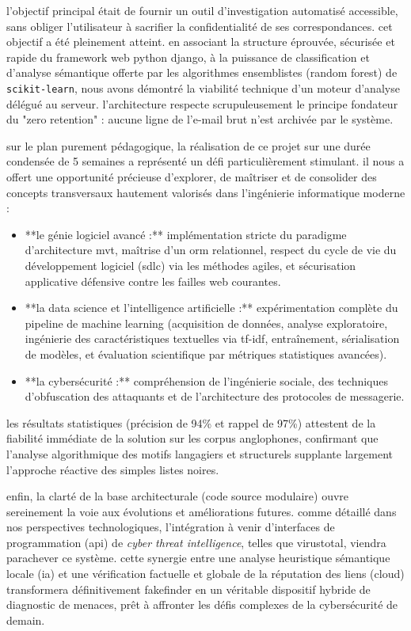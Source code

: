 \documentclass[12pt,a4paper]{report}
\begin{document}
l'objectif principal était de fournir un outil d'investigation automatisé accessible, sans obliger l'utilisateur à sacrifier la confidentialité de ses correspondances. cet objectif a été pleinement atteint. en associant la structure éprouvée, sécurisée et rapide du framework web python django, à la puissance de classification et d'analyse sémantique offerte par les algorithmes ensemblistes (random forest) de \texttt{scikit-learn}, nous avons démontré la viabilité technique d'un moteur d'analyse délégué au serveur. l'architecture respecte scrupuleusement le principe fondateur du "zero retention" : aucune ligne de l'e-mail brut n'est archivée par le système.

sur le plan purement pédagogique, la réalisation de ce projet sur une durée condensée de 5 semaines a représenté un défi particulièrement stimulant. il nous a offert une opportunité précieuse d'explorer, de maîtriser et de consolider des concepts transversaux hautement valorisés dans l'ingénierie informatique moderne :
\begin{itemize}
    \item **le génie logiciel avancé :** implémentation stricte du paradigme d'architecture mvt, maîtrise d'un orm relationnel, respect du cycle de vie du développement logiciel (sdlc) via les méthodes agiles, et sécurisation applicative défensive contre les failles web courantes.
    \item **la data science et l'intelligence artificielle :** expérimentation complète du pipeline de machine learning (acquisition de données, analyse exploratoire, ingénierie des caractéristiques textuelles via tf-idf, entraînement, sérialisation de modèles, et évaluation scientifique par métriques statistiques avancées).
    \item **la cybersécurité :** compréhension de l'ingénierie sociale, des techniques d'obfuscation des attaquants et de l'architecture des protocoles de messagerie.
\end{itemize}

les résultats statistiques (précision de 94\% et rappel de 97\%) attestent de la fiabilité immédiate de la solution sur les corpus anglophones, confirmant que l'analyse algorithmique des motifs langagiers et structurels supplante largement l'approche réactive des simples listes noires.

enfin, la clarté de la base architecturale (code source modulaire) ouvre sereinement la voie aux évolutions et améliorations futures. comme détaillé dans nos perspectives technologiques, l'intégration à venir d'interfaces de programmation (api) de \textit{cyber threat intelligence}, telles que virustotal, viendra parachever ce système. cette synergie entre une analyse heuristique sémantique locale (ia) et une vérification factuelle et globale de la réputation des liens (cloud) transformera définitivement fakefinder en un véritable dispositif hybride de diagnostic de menaces, prêt à affronter les défis complexes de la cybersécurité de demain.
\end{document}
